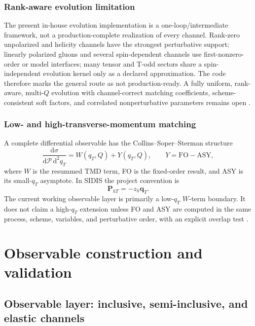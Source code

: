 \documentclass[11pt,oneside]{book}
\newcommand{\dd}{\mathrm{d}}
\begin{document}
\section{Rank-aware evolution limitation}

The present in-house evolution implementation is a one-loop/intermediate framework, not a production-complete realization of every channel.  Rank-zero unpolarized and helicity channels have the strongest perturbative support; linearly polarized gluons and several spin-dependent channels use first-nonzero-order or model interfaces; many tensor and T-odd sectors share a spin-independent evolution kernel only as a declared approximation.  The code therefore marks the general route as not production-ready.  A fully uniform, rank-aware, multi-$Q$ evolution with channel-correct matching coefficients, scheme-consistent soft factors, and correlated nonperturbative parameters remains open \cite{DWProductionBoundary2026}.

\section{Low- and high-transverse-momentum matching}

A complete differential observable has the Collins--Soper--Sterman structure
\begin{equation}
 \frac{\dd\sigma}{\dd\mathcal P\,\dd^2q_T}
 =W(q_T,Q)+Y(q_T,Q),
 \qquad
 Y=\mathrm{FO}-\mathrm{ASY},
 \label{eq:WplusY}
\end{equation}
where $W$ is the resummed TMD term, FO is the fixed-order result, and ASY is its small-$q_T$ asymptote.  In SIDIS the project convention is
\begin{equation}
 \bm P_{hT}=-z_h\bm q_T.
 \label{eq:PhT-qT}
\end{equation}
The current working observable layer is primarily a low-$q_T$ $W$-term boundary.  It does not claim a high-$q_T$ extension unless FO and ASY are computed in the same process, scheme, variables, and perturbative order, with an explicit overlap test \cite{BacchettaEtAl2007SIDIS,JiMaYuan2005,Collins2011}.

\part{Observable construction and validation}

\chapter{Observable layer: inclusive, semi-inclusive, and elastic channels}
\label{chap:observables}
\end{document}

